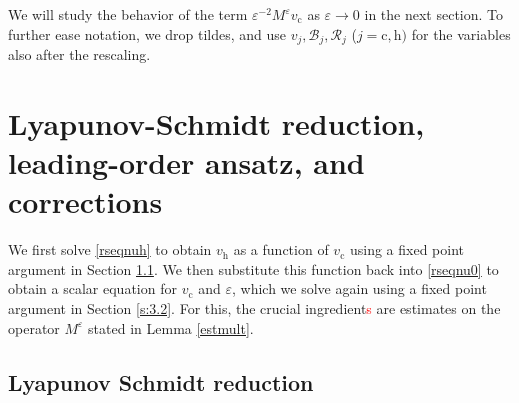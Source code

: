 \documentclass[10pt]{article}
\newcommand{\eps}{\varepsilon}
\newcommand{\B}{\mathcal{B}}
\newcommand{\Rm}{\mathcal{R}}
\begin{document}
We will study the behavior of the term $\eps^{-2}M^\eps v_\mathrm{c}$ as $\eps \to 0$ in the next section. 
To further ease notation, we drop tildes, and use $v_j,\B_j,\Rm_j$ ($j=\mathrm{c,h})$ for the variables also after the rescaling. 




\section{Lyapunov-Schmidt reduction, leading-order ansatz, and corrections}\label{s:3}



We first solve \eqref{rseqnuh} to obtain $v_\mathrm{h}$ as a function of $v_\mathrm{c}$ using a fixed point argument in Section \ref{s:3.1}. We then substitute this function back into  \eqref{rseqnu0} to obtain a scalar equation for $v_\mathrm{c}$ and $\eps$, which we solve again using a fixed point argument in Section \ref{s:3.2}. For this, the crucial ingredient\textcolor{red}{s} are estimates on the operator $M^\eps$ stated in Lemma \ref{estmult}. 

\subsection{Lyapunov Schmidt reduction}\label{s:3.1}
\end{document}
